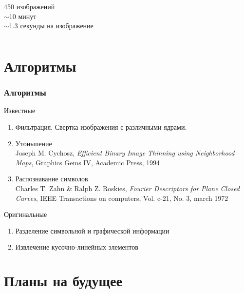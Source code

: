 \begin{frame}
\begin{columns}
\begin{column}{0.5\textwidth}
\begin{center}
        450 изображений \\ $\sim$10 минут \\ $\sim$1.3 секунды на изображение  \end{center}
    \end{column}
  \end{columns}
\end{frame}

\section{Алгоритмы}

\begin{frame}
  \frametitle{Алгоритмы}

  Известные

  \begin{enumerate}
    \item Фильтрация. Свертка изображения с различными ядрами.
    \item Утоньшение \\ 
      Joseph M. Cychosz, \emph{Efficient Binary Image Thinning using Neighborhood Maps}, Graphics Gems IV, Academic Press, 1994
    \item Распознавание символов \\
      Charles T. Zahn \& Ralph Z. Roskies,
  \emph{Fourier Descriptors for Plane Closed Curves},
   IEEE Transactions on computers, Vol. c-21, No. 3, march 1972
  \end{enumerate}
      
  Оригинальные

  \begin{enumerate}
    \item Разделение символьной и графической информации
    \item Извлечение кусочно-линейных элементов
  \end{enumerate}
\end{frame}

\section{Планы на будущее}

